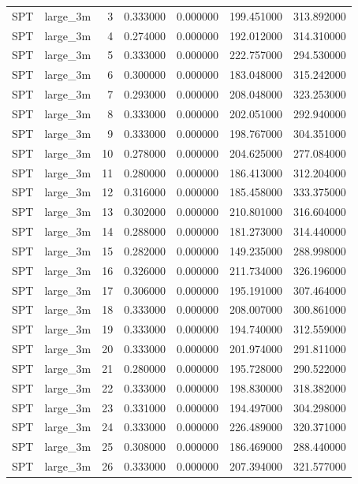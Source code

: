 \begin{tabular}{llrrrrr}
SPT & large_3m & 3 & 0.333000 & 0.000000 & 199.451000 & 313.892000 \\
SPT & large_3m & 4 & 0.274000 & 0.000000 & 192.012000 & 314.310000 \\
SPT & large_3m & 5 & 0.333000 & 0.000000 & 222.757000 & 294.530000 \\
SPT & large_3m & 6 & 0.300000 & 0.000000 & 183.048000 & 315.242000 \\
SPT & large_3m & 7 & 0.293000 & 0.000000 & 208.048000 & 323.253000 \\
SPT & large_3m & 8 & 0.333000 & 0.000000 & 202.051000 & 292.940000 \\
SPT & large_3m & 9 & 0.333000 & 0.000000 & 198.767000 & 304.351000 \\
SPT & large_3m & 10 & 0.278000 & 0.000000 & 204.625000 & 277.084000 \\
SPT & large_3m & 11 & 0.280000 & 0.000000 & 186.413000 & 312.204000 \\
SPT & large_3m & 12 & 0.316000 & 0.000000 & 185.458000 & 333.375000 \\
SPT & large_3m & 13 & 0.302000 & 0.000000 & 210.801000 & 316.604000 \\
SPT & large_3m & 14 & 0.288000 & 0.000000 & 181.273000 & 314.440000 \\
SPT & large_3m & 15 & 0.282000 & 0.000000 & 149.235000 & 288.998000 \\
SPT & large_3m & 16 & 0.326000 & 0.000000 & 211.734000 & 326.196000 \\
SPT & large_3m & 17 & 0.306000 & 0.000000 & 195.191000 & 307.464000 \\
SPT & large_3m & 18 & 0.333000 & 0.000000 & 208.007000 & 300.861000 \\
SPT & large_3m & 19 & 0.333000 & 0.000000 & 194.740000 & 312.559000 \\
SPT & large_3m & 20 & 0.333000 & 0.000000 & 201.974000 & 291.811000 \\
SPT & large_3m & 21 & 0.280000 & 0.000000 & 195.728000 & 290.522000 \\
SPT & large_3m & 22 & 0.333000 & 0.000000 & 198.830000 & 318.382000 \\
SPT & large_3m & 23 & 0.331000 & 0.000000 & 194.497000 & 304.298000 \\
SPT & large_3m & 24 & 0.333000 & 0.000000 & 226.489000 & 320.371000 \\
SPT & large_3m & 25 & 0.308000 & 0.000000 & 186.469000 & 288.440000 \\
SPT & large_3m & 26 & 0.333000 & 0.000000 & 207.394000 & 321.577000 \\

\end{tabular}
